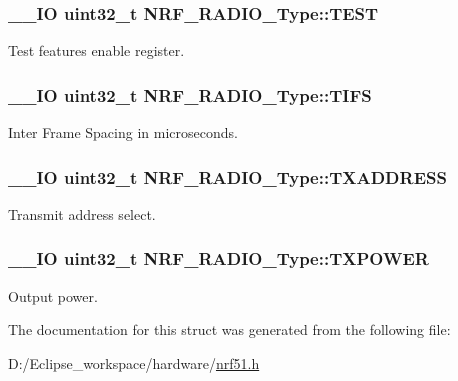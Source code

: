 \subsubsection[{T\+E\+S\+T}]{\setlength{\rightskip}{0pt plus 5cm}\+\_\+\+\_\+\+I\+O uint32\+\_\+t N\+R\+F\+\_\+\+R\+A\+D\+I\+O\+\_\+\+Type\+::\+T\+E\+S\+T}\label{struct_n_r_f___r_a_d_i_o___type_a3d2638805c6a50e1d0a94591d65d4312}
Test features enable register. \hypertarget{struct_n_r_f___r_a_d_i_o___type_a9767b2f76442755ffd041f2cf81a5e1b}{}
\subsubsection[{T\+I\+F\+S}]{\setlength{\rightskip}{0pt plus 5cm}\+\_\+\+\_\+\+I\+O uint32\+\_\+t N\+R\+F\+\_\+\+R\+A\+D\+I\+O\+\_\+\+Type\+::\+T\+I\+F\+S}\label{struct_n_r_f___r_a_d_i_o___type_a9767b2f76442755ffd041f2cf81a5e1b}
Inter Frame Spacing in microseconds. \hypertarget{struct_n_r_f___r_a_d_i_o___type_a2769e68482b3b23d2af033f92737bbfa}{}
\subsubsection[{T\+X\+A\+D\+D\+R\+E\+S\+S}]{\setlength{\rightskip}{0pt plus 5cm}\+\_\+\+\_\+\+I\+O uint32\+\_\+t N\+R\+F\+\_\+\+R\+A\+D\+I\+O\+\_\+\+Type\+::\+T\+X\+A\+D\+D\+R\+E\+S\+S}\label{struct_n_r_f___r_a_d_i_o___type_a2769e68482b3b23d2af033f92737bbfa}
Transmit address select. \hypertarget{struct_n_r_f___r_a_d_i_o___type_a5bd623d57d99f7be1eabda6de3f90d4b}{}
\subsubsection[{T\+X\+P\+O\+W\+E\+R}]{\setlength{\rightskip}{0pt plus 5cm}\+\_\+\+\_\+\+I\+O uint32\+\_\+t N\+R\+F\+\_\+\+R\+A\+D\+I\+O\+\_\+\+Type\+::\+T\+X\+P\+O\+W\+E\+R}\label{struct_n_r_f___r_a_d_i_o___type_a5bd623d57d99f7be1eabda6de3f90d4b}
Output power. 

The documentation for this struct was generated from the following file\+:\begin{DoxyCompactItemize}
\item 
D\+:/\+Eclipse\+\_\+workspace/hardware/\hyperlink{nrf51_8h}{nrf51.\+h}\end{DoxyCompactItemize}
